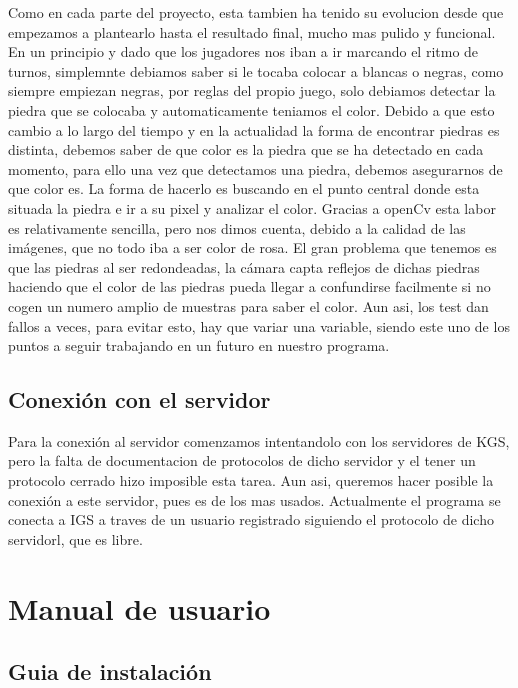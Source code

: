 \documentclass[12pt,a4paper]{report}
\begin{document}
Como en cada parte del proyecto, esta tambien ha tenido su evolucion desde que
empezamos a plantearlo hasta el resultado final, mucho mas pulido y funcional.
En un principio y dado que los jugadores nos iban a ir marcando el ritmo de
turnos, simplemnte debiamos saber si le tocaba colocar a blancas o negras, como
siempre empiezan negras, por reglas del propio juego, solo debiamos detectar la
piedra que se colocaba y automaticamente teniamos el color.  Debido a que esto
cambio a lo largo del tiempo y en la actualidad la forma de encontrar piedras es
distinta, debemos saber de que color es la piedra que se ha detectado en cada
momento, para ello una vez que detectamos una piedra, debemos asegurarnos de que
color es. La forma de hacerlo es buscando en el punto central donde esta situada
la piedra e ir a su pixel y analizar el color. Gracias a openCv esta labor es
relativamente sencilla, pero nos dimos cuenta, debido a la calidad de las
imágenes, que no todo iba a ser color de rosa. El gran problema que tenemos es
que las piedras al ser redondeadas, la cámara capta reflejos de dichas piedras
haciendo que el color de las piedras pueda llegar a confundirse facilmente si no
cogen un numero amplio de muestras para saber el color. Aun asi, los test dan
fallos a veces, para evitar esto, hay que variar una variable, siendo este uno
de los puntos a seguir trabajando en un futuro en nuestro programa.


\section{Conexión con el servidor}

Para la conexión al servidor comenzamos intentandolo con los servidores de KGS,
pero la falta de documentacion de protocolos de dicho servidor y el tener un
protocolo cerrado hizo imposible esta tarea. Aun asi, queremos hacer posible la
conexión a este servidor, pues es de los mas usados. Actualmente el programa se
conecta a IGS a traves de un usuario registrado siguiendo el protocolo de dicho
servidorl, que es libre.


\chapter{Manual de usuario}

\section{Guia de instalación} 
\end{document}
